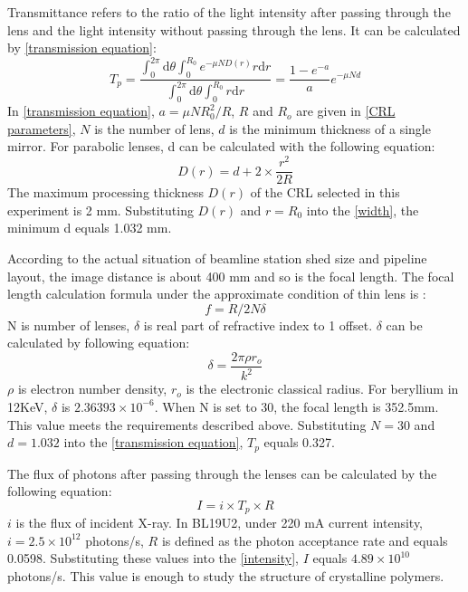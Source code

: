 \documentclass{Head}
\begin{document}
Transmittance refers to the ratio of the light intensity after passing through the lens and the light intensity without passing through the lens.
It can be calculated by \autoref{transmission equation}\cite{Lengeler:ht2006}:
\begin{equation}
    T_p=\frac{\int_0^{2\pi}\mathrm{d}\theta\int_0^{R_0}e^{-\mu ND(r)}r\mathrm{d}r}{\int_0^{2\pi}\mathrm{d}\theta\int_0^{R_0}r\mathrm{d}r}=\frac{1-e^{-a}}{a}e^{-\mu Nd}
    \label{transmission equation}
\end{equation}
In \autoref{transmission equation}, $a=\mu N R_0^2/R$, $R$ and $R_o$ are given in \autoref{CRL parameters}, $N$ is the number of lens, $d$ is the minimum thickness of a single mirror.
For parabolic lenses, d can be calculated with the following equation:
\begin{equation}
    D(r)=d+2\times \frac{r^2}{2R}
    \label{width}
\end{equation}
The maximum processing thickness $D(r)$ of the CRL selected in this experiment is 2 mm.
Substituting $D(r)$ and $r=R_0$ into the \autoref{width}, the minimum d equals 1.032 mm.



According to the actual situation of beamline station shed size and pipeline layout, the image distance is about 400 mm and so is the focal length.
The focal length calculation formula under the approximate condition of thin lens is :
\begin{equation}
    f=R/2N\delta
\end{equation}
N is number of lenses, $\delta$ is real part of refractive index to 1 offset.
$\delta$ can be calculated by following equation\cite{als2011elements}:
\begin{equation}
    \delta=\frac{2\pi\rho r_o}{k^2}
\end{equation}
$\rho$ is electron number density, $r_o$ is the electronic classical radius.
For beryllium in 12KeV, $\delta$ is $2.36393\times 10^{-6}$.
When N is set to 30, the focal length is 352.5mm.
This value meets the requirements described above.
Substituting $N=30$ and $d=1.032$ into the \autoref{transmission equation}, $T_p$ equals 0.327.


The flux of photons after passing through the lenses can be calculated by the following equation:
\begin{equation}
    I=i\times T_p \times R
    \label{intensity}
\end{equation}
$i$ is the flux of incident X-ray.
In BL19U2, under 220 mA current intensity, $i=2.5\times 10^{12}$ photons/s, $R$ is defined as the photon acceptance rate and equals 0.0598.
Substituting these values into the \autoref{intensity}, $I$ equals $4.89\times 10^{10}$ photons/s. This value is enough to study the structure of crystalline polymers.
\end{document}

